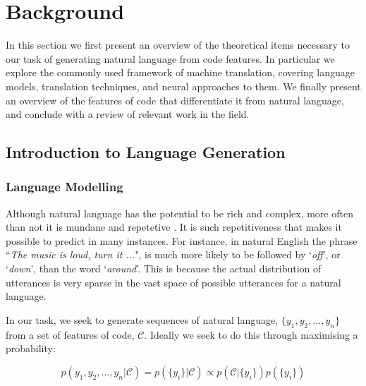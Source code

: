 \chapter{Background}
\label{background}

In this section we first present an overview of the theoretical items necessary to our task of generating natural language from code features.
In particular we explore the commonly used framework of machine translation, covering language models, translation techniques, and neural approaches to them. 
We finally present an overview of the features of code that differentiate it from natural language, and conclude with a review of relevant work in the field.

\section{Introduction to Language Generation} %
\label{sec:lstm}

\subsection{Language Modelling} %
\label{sub:recurrent_neural_networks}

Although natural language has the potential to be rich and complex, more often than not it is mundane and repetetive \cite{hindle_naturalness_nodate}. 
It is such repetitiveness that makes it possible to predict in many instances. For instance, in natural English the phrase ``\textit{The music is loud, turn it ...}", is much more likely to be followed by `\textit{off}', or `\textit{down}', than the word `\textit{around}'.
This is because the actual distribution of utterances is very sparse in  the vast space of possible utterances for a natural language.

In our task, we seek to generate sequences of natural language, $\{y_1, y_2,..., y_n\}$ from a set of features of code, $\mathcal{C}$.
Ideally we seek to do this through maximising a probability:

$$p(y_1, y_2,...,y_n | \mathcal{C}) = p(\{y_i\}| \mathcal{C}) \propto p(\mathcal{C} | \{y_i\})  p(\{y_i\})$$

